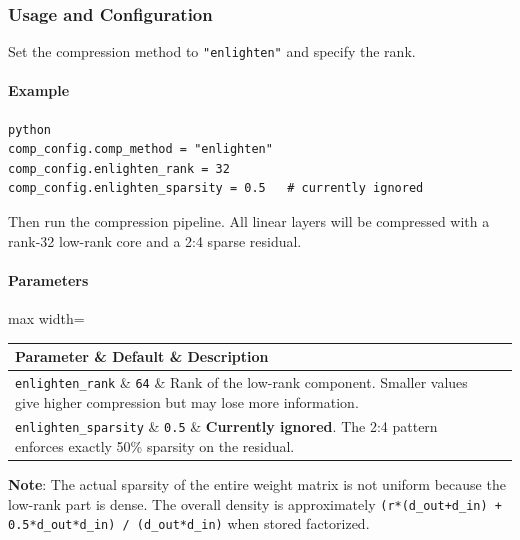 \subsubsection*{Usage and Configuration}

Set the compression method to \texttt{"enlighten"} and specify the rank.

\paragraph{Example}

\vspace{0.5em}
\begin{mdframed}[backgroundcolor=codebg, linecolor=codeframe, linewidth=1pt, roundcorner=4pt, innerleftmargin=2pt, innerrightmargin=5pt, innertopmargin=5pt, innerbottommargin=5pt]
\begin{lstlisting}
python
comp_config.comp_method = "enlighten"
comp_config.enlighten_rank = 32
comp_config.enlighten_sparsity = 0.5   # currently ignored
\end{lstlisting}
\end{mdframed}
\vspace{0.5em}

Then run the compression pipeline. All linear layers will be compressed with a rank-32 low-rank core and a 2:4 sparse residual.

\paragraph{Parameters}

\begin{center}
\begin{adjustbox}{max width=\columnwidth}
\renewcommand{\arraystretch}{1.2}
\begin{tabular}{lll}
\toprule
Parameter \& Default \& Description \\
\midrule
\texttt{enlighten\_rank} \& \texttt{64} \& Rank of the low-rank component. Smaller values give higher compression but may lose more information. \\
\texttt{enlighten\_sparsity} \& \texttt{0.5} \& \textbf{Currently ignored}. The 2:4 pattern enforces exactly 50\% sparsity on the residual. \\

\bottomrule
\end{tabular}
\end{adjustbox}
\end{center}
\textbf{Note}: The actual sparsity of the entire weight matrix is not uniform because the low-rank part is dense. The overall density is approximately \texttt{(r*(d\_out+d\_in) + 0.5*d\_out*d\_in) / (d\_out*d\_in)} when stored factorized.


